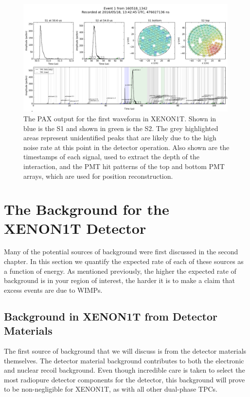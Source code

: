 \begin{figure}[t]
	\centering
	\includegraphics[width=0.99\textwidth]{xe1t_pax_output_first_waveform}
	\caption{The PAX output for the first waveform in XENON1T.  Shown in blue is the S1 and shown in green is the S2.  The grey highlighted areas represent unidentified peaks that are likely due to the high noise rate at this point in the detector operation.  Also shown are the timestamps of each signal, used to extract the depth of the interaction, and the PMT hit patterns of the top and bottom PMT arrays, which are used for position reconstruction.}
	\label{fig:xe1t_pax_output_first_waveform}
\end{figure}


\section{The Background for the XENON1T Detector}
\label{sec:xe1t_bkg}

Many of the potential sources of background were first discussed in the second chapter.  In this section we quantify the expected rate of each of these sources as a function of energy.  As mentioned previously, the higher the expected rate of background is in your region of interest, the harder it is to make a claim that excess events are due to WIMPs.  


\subsection{Background in XENON1T from Detector Materials}
\label{sec:xe1t_materials_bkg}

The first source of background that we will discuss is from the detector materials themselves.  The detector material background contributes to both the electronic and nuclear recoil background.  Even though incredible care is taken to select the most radiopure detector components for the detector, this background will prove to be non-negligible for XENON1T, as with all other dual-phase TPCs.

